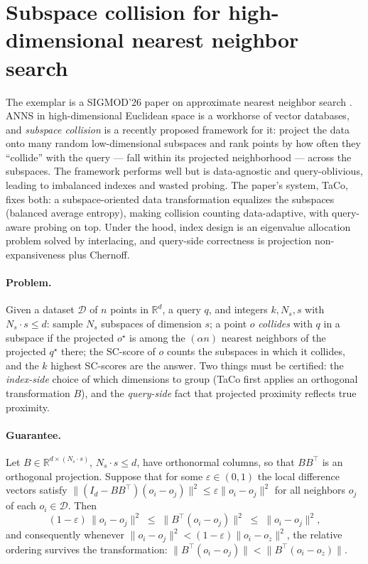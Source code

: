 \section{Subspace collision for high-dimensional nearest neighbor search}
\label{sec:spec-taco}

The exemplar is a SIGMOD'26 paper on approximate nearest neighbor search
\citep{sigmod26-235}. ANNS in high-dimensional Euclidean space is a workhorse
of vector databases, and \emph{subspace collision} is a recently proposed
framework for it: project the data onto many random low-dimensional
subspaces and rank points by how often they ``collide'' with the query ---
fall within its projected neighborhood --- across the subspaces. The
framework performs well but is data-agnostic and query-oblivious, leading to
imbalanced indexes and wasted probing. The paper's system, TaCo, fixes both:
a subspace-oriented data transformation equalizes the subspaces (balanced
average entropy), making collision counting data-adaptive, with query-aware
probing on top. Under the hood, index design is an eigenvalue allocation
problem solved by interlacing, and query-side correctness is projection
non-expansiveness plus Chernoff.

\paragraph{Problem.}
Given a dataset $\mathcal{D}$ of $n$ points in $\mathbb{R}^d$, a query $q$,
and integers $k, N_s, s$ with $N_s \cdot s \le d$: sample $N_s$ subspaces of
dimension $s$; a point $o$ \emph{collides} with $q$ in a subspace if the
projected $o^{\star}$ is among the $(\alpha n)$ nearest neighbors of the
projected $q^{\star}$ there; the SC-score of $o$ counts the subspaces in
which it collides, and the $k$ highest SC-scores are the answer. Two things
must be certified: the \emph{index-side} choice of which dimensions to
group (TaCo first applies an orthogonal transformation $B$), and the
\emph{query-side} fact that projected proximity reflects true proximity.

\paragraph{Guarantee.}

\begin{theorem}\label{thm:spec-taco-order}
Let $B \in \mathbb{R}^{d \times (N_s \cdot s)}$, $N_s \cdot s \le d$, have
orthonormal columns, so that $BB^{\top}$ is an orthogonal projection.
Suppose that for some $\varepsilon \in (0,1)$ the local difference vectors
satisfy $\|(I_d - BB^{\top})(o_i - o_j)\|^2 \le \varepsilon \|o_i - o_j\|^2$
for all neighbors $o_j$ of each $o_i \in \mathcal{D}$. Then
\[
(1 - \varepsilon)\,\|o_i - o_j\|^2 \;\le\; \|B^{\top}(o_i - o_j)\|^2 \;\le\;
\|o_i - o_j\|^2,
\]
and consequently whenever $\|o_i - o_j\|^2 < (1-\varepsilon)\|o_i -
o_z\|^2$, the relative ordering survives the transformation:
$\|B^{\top}(o_i - o_j)\| < \|B^{\top}(o_i - o_z)\|$. \eop
\end{theorem}

